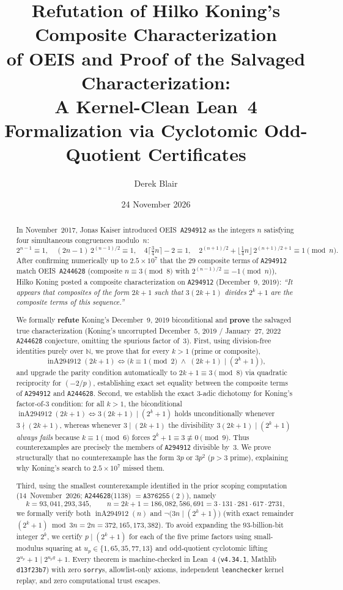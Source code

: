 \documentclass[11pt]{article}
\title{Refutation of Hilko Koning's Composite Characterization\\of OEIS \seq{A294912} and Proof of the Salvaged Characterization:\\[2pt]
\large A Kernel-Clean Lean~4 Formalization via Cyclotomic Odd-Quotient Certificates}
\author{Derek Blair}
\date{24 November 2026}
\theoremstyle{definition}
\newcommand{\N}{\mathbb{N}}
\newcommand{\seq}[1]{\texttt{#1}}
\newcommand{\inA}{\operatorname{inA294912}}
\begin{document}
\maketitle

\begin{abstract}
In November~2017, Jonas Kaiser introduced OEIS~\seq{A294912} as the integers $n$ satisfying four simultaneous congruences modulo~$n$:
\[
2^{n-1} \equiv 1, \quad (2n - 1)\,2^{(n-1)/2} \equiv 1, \quad 4\lceil \tfrac{3}{4}n \rceil - 2 \equiv 1, \quad 2^{(n+1)/2} + \lfloor \tfrac{1}{4}n \rfloor\,2^{(n+1)/2 + 1} \equiv 1 \pmod{n}.
\]
After confirming numerically up to $2.5 \times 10^7$ that the $29$ composite terms of \seq{A294912} match OEIS~\seq{A244628} (composite $n \equiv 3 \pmod 8$ with $2^{(n-1)/2} \equiv -1 \pmod n$), Hilko Koning posted a composite characterization on \seq{A294912} (December~9, 2019):
\emph{``It appears that composites of the form $2k+1$ such that $3(2k+1)$ divides $2^k+1$ are the composite terms of this sequence.''}

We formally \textbf{refute} Koning's December~9, 2019 biconditional and \textbf{prove} the salvaged true characterization (Koning's uncorrupted December~5, 2019 / January~27, 2022 \seq{A244628} conjecture, omitting the spurious factor of~$3$). First, using division-free identities purely over $\N$, we prove that for every $k > 1$ (prime or composite),
\[
\inA(2k + 1) \iff \bigl(k \equiv 1 \pmod 2 \;\land\; (2k + 1) \mid (2^k + 1)\bigr),
\]
and upgrade the parity condition automatically to $2k + 1 \equiv 3 \pmod 8$ via quadratic reciprocity for $(-2/p)$, establishing exact set equality between the composite terms of \seq{A294912} and \seq{A244628}. Second, we establish the exact $3$-adic dichotomy for Koning's factor-of-$3$ condition: for all $k > 1$, the biconditional $\inA(2k+1) \iff 3(2k+1) \mid (2^k+1)$ holds unconditionally whenever $3 \nmid (2k+1)$, whereas whenever $3 \mid (2k+1)$ the divisibility $3(2k+1) \mid (2^k+1)$ \emph{always fails} because $k \equiv 1 \pmod 6$ forces $2^k + 1 \equiv 3 \not\equiv 0 \pmod 9$. Thus counterexamples are precisely the members of \seq{A294912} divisible by~$3$. We prove structurally that no counterexample has the form $3p$ or $3p^2$ ($p > 3$ prime), explaining why Koning's search to $2.5 \times 10^7$ missed them.

Third, using the smallest counterexample identified in the prior scoping computation (14~November~2026; \seq{A244628}(1138) $= \seq{A376255}(2)$), namely
\[
k = 93{,}041{,}293{,}345, \qquad n = 2k + 1 = 186{,}082{,}586{,}691 = 3 \cdot 131 \cdot 281 \cdot 617 \cdot 2731,
\]
we formally verify both $\inA(n)$ and $\neg\bigl(3n \mid (2^k + 1)\bigr)$ (with exact remainder $(2^k + 1) \bmod 3n = 2n = 372{,}165{,}173{,}382$). To avoid expanding the $93$-billion-bit integer $2^k$, we certify $p \mid (2^k + 1)$ for each of the five prime factors using small-modulus squaring at $u_p \in \{1, 65, 35, 77, 13\}$ and odd-quotient cyclotomic lifting $2^{u_p} + 1 \mid 2^{u_p q} + 1$. Every theorem is machine-checked in Lean~4 (\texttt{v4.34.1}, Mathlib \texttt{d13f23b7}) with zero \texttt{sorry}s, allowlist-only axioms, independent \texttt{leanchecker} kernel replay, and zero computational trust escapes.
\end{abstract}
\end{document}
